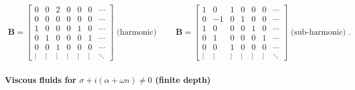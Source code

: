 \documentclass[prfluids]{revtex4-2}
\begin{document}
\begin{eqnarray}
\textbf{B} =
\left[\begin{matrix}
  0 &0 &2 &0 &0 & 0 &\cdots \\
  0 &0 &0 &0 &0 & 0 &\cdots \\
  1 &0 &0 &0 &1 & 0 &\cdots \\
  0 &1 &0 &0 &0 & 1 &\cdots \\
  0 &0 &1 &0 &0 & 0 &\cdots \\
  \vdots & \vdots & \vdots & \vdots & \vdots &\vdots & \ddots
\end{matrix}\right]
\text{ (harmonic) }
\quad\quad
\textbf{B} =
\left[\begin{matrix}
  1 &0 &1 &0 &0 & 0 &\cdots \\
  0 &-1&0 &1 &0 & 0 &\cdots \\
  1 &0 &0 &0 &1 & 0 &\cdots \\
  0 &1 &0 &0 &0 & 1 &\cdots \\
  0 &0 &1 &0 &0 & 0 &\cdots \\
  \vdots & \vdots & \vdots & \vdots & \vdots &\vdots & \ddots
\end{matrix}\right]
\text{ (sub-harmonic) }.
\end{eqnarray}


\newpage
\clearpage
{}
\recalctypearea

\paragraph{Viscous fluids for $\sigma + i(\alpha + \omega n)\neq0$ (finite depth)}
\end{document}
